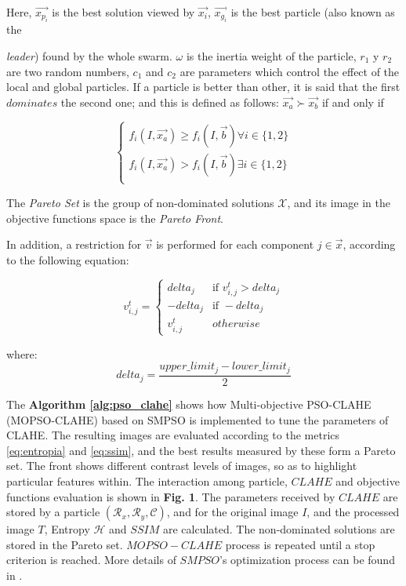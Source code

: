 \documentclass[spanish,twocolumn]{article}
\begin{document}
Here, $\overrightarrow{x_{p_i}}$ is the best solution viewed by $\overrightarrow{x_i}$, $\overrightarrow{x_{g_i}}$ is the best particle (also known as the {{\it leader}) found by the whole swarm. $\omega$ is the inertia weight of the particle, $r_1$ y $r_2$ are two random numbers, $c_1$ and $c_2$ are parameters which control the effect of the local and global particles. If a particle is better than other, it is said that the first $dominates$ the second one; and this is defined as follows: $\overrightarrow{x_{a}} \succ \overrightarrow{x_b}$ if and only if

\begin{equation}\label{eq:dominanciapareto}
         \begin{cases}  f_i(I,\overrightarrow{x_{a}})  \geq f_i(I,\overrightarrow{b}) \forall i \in \{1,2\} \\
                        f_i(I,\overrightarrow{x_{a}}) > f_i(I,\overrightarrow{b}) \exists i \in \{1,2\} \\
         \end{cases}
\end{equation}

The {\it Pareto Set} is the group of non-dominated solutions $\mathscr{X}$, and its image in the objective functions space is the  {\it Pareto Front}.

In addition, a restriction for $\overrightarrow{v}$ is performed for each component $j \in \overrightarrow{x}$, according to the following equation:
               
\begin{equation}\label{eq:restricciondelta}
    v_{i,j}^t = \begin{cases}  delta_j &\mbox{if } v_{i,j}^t > delta_j \\
                                -delta_j & \mbox{if } -delta_j \\
                                v_{i,j}^t & otherwise \end{cases}
\end{equation}

where: 
\begin{equation} \label{eq:restricciondelta2}
delta_j= \frac{upper\_limit_j - lower\_limit_j}{2}
\end{equation}

The \textbf{Algorithm \ref{alg:pso_clahe}} shows how Multi-objective PSO-CLAHE (MOPSO-CLAHE) based on SMPSO is implemented to tune the parameters of CLAHE. The resulting images are evaluated according to the metrics \eqref{eq:entropia} and \eqref{eq:ssim}, and the best results measured by these form a Pareto set. The front shows different contrast levels of images, so as to highlight particular features within. The interaction among particle, $CLAHE$ and objective functions evaluation is shown in \textbf {Fig. 1}. The parameters received by $CLAHE$ are stored by a particle $(\mathcal{R}_x,\mathcal{R}_y, \mathscr{C})$, and for the original image $I$, and the processed image $T$, Entropy $\mathscr{H}$ and $SSIM$ are calculated. The non-dominated solutions are stored in the Pareto set. $MOPSO-CLAHE$ process is repeated until a stop criterion is reached. More details of $SMPSO$'s optimization process can be found in \cite{4938830}.

}
\end{document}
